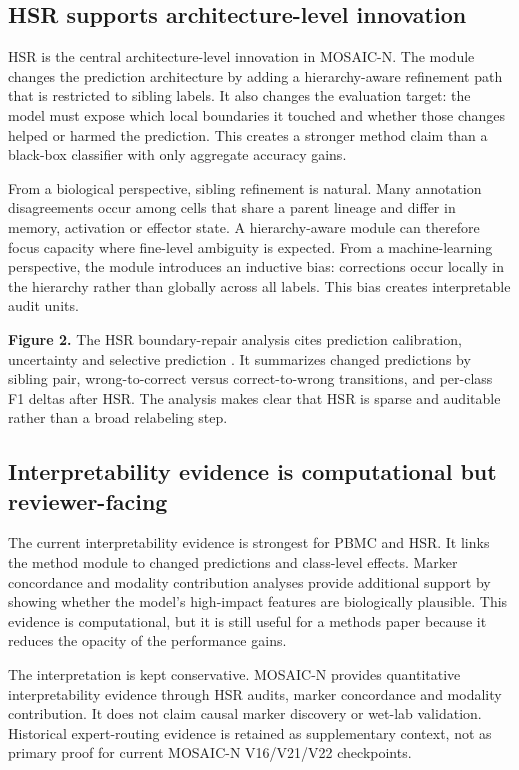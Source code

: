 \documentclass[unnumsec,webpdf,contemporary,large,numbered]{oup-authoring-template}
\begin{document}
\subsection{HSR supports architecture-level innovation}

HSR is the central architecture-level innovation in MOSAIC-N. The module changes the prediction architecture by adding a hierarchy-aware refinement path that is restricted to sibling labels. It also changes the evaluation target: the model must expose which local boundaries it touched and whether those changes helped or harmed the prediction. This creates a stronger method claim than a black-box classifier with only aggregate accuracy gains.

From a biological perspective, sibling refinement is natural. Many annotation disagreements occur among cells that share a parent lineage and differ in memory, activation or effector state. A hierarchy-aware module can therefore focus capacity where fine-level ambiguity is expected. From a machine-learning perspective, the module introduces an inductive bias: corrections occur locally in the hierarchy rather than globally across all labels. This bias creates interpretable audit units.

\noindent\textbf{Figure 2.}
The HSR boundary-repair analysis cites prediction calibration, uncertainty and selective prediction \citep{guo2017calibration,lakshminarayanan2017,gal2016,hendrycks2017,geifman2017}. It summarizes changed predictions by sibling pair, wrong-to-correct versus correct-to-wrong transitions, and per-class F1 deltas after HSR. The analysis makes clear that HSR is sparse and auditable rather than a broad relabeling step.

\subsection{Interpretability evidence is computational but reviewer-facing}

The current interpretability evidence is strongest for PBMC and HSR. It links the method module to changed predictions and class-level effects. Marker concordance and modality contribution analyses provide additional support by showing whether the model's high-impact features are biologically plausible. This evidence is computational, but it is still useful for a methods paper because it reduces the opacity of the performance gains.

The interpretation is kept conservative. MOSAIC-N provides quantitative interpretability evidence through HSR audits, marker concordance and modality contribution. It does not claim causal marker discovery or wet-lab validation. Historical expert-routing evidence is retained as supplementary context, not as primary proof for current MOSAIC-N V16/V21/V22 checkpoints.
\end{document}
